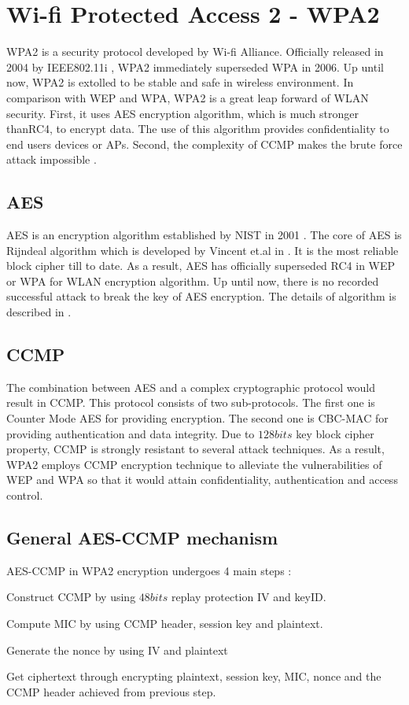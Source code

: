 \section{Wi-fi Protected Access 2 - WPA2}

\ac{WPA}2 is a security protocol developed by Wi-fi Alliance. Officially released in 2004 by \ac{IEEE}802.11i \cite{4248378}, \ac{WPA}2 immediately superseded \ac{WPA} in 2006. Up until now, \ac{WPA}2 is extolled to be stable and safe in wireless environment. In comparison with \ac{WEP} and \ac{WPA}, \ac{WPA}2 is a great leap forward of \ac{WLAN} security. First, it uses \ac{AES} encryption algorithm, which is much stronger than\ac{RC4}, to encrypt data. The use of this algorithm provides confidentiality to end users devices or \ac{AP}s. Second, the complexity of \ac{CCMP} makes the brute force attack impossible \cite{alblwi2017survey}.
\subsection{AES}
\ac{AES} is an encryption algorithm established by \ac{NIST} in 2001 \cite{standard2001announcing}. The core of \ac{AES} is Rijndeal algorithm which is developed by Vincent et.al in \cite{daemen1999aes}. It is the most reliable block cipher till to date. As a result, \ac{AES} has officially superseded \ac{RC4} in \ac{WEP} or \ac{WPA} for \ac{WLAN} encryption algorithm. Up until now, there is no recorded successful attack to break the key of \ac{AES} encryption. The details of algorithm is described in \cite{daemen1999aes}.
\subsection{CCMP}
The combination between \ac{AES} and a complex cryptographic protocol would result in \ac{CCMP}. This protocol consists of two sub-protocols. The first one is Counter Mode \ac{AES} for providing encryption. The second one is \ac{CBC-MAC} for providing authentication and data integrity. Due to $128bits$ key block cipher property, \ac{CCMP} is strongly resistant to several attack techniques. As a result, \ac{WPA}2 employs \ac{CCMP} encryption technique to alleviate the vulnerabilities of \ac{WEP} and \ac{WPA} so that it would attain confidentiality, authentication and access control.
\subsection{General AES-CCMP mechanism}
\ac{AES}-\ac{CCMP} in \ac{WPA}2 encryption undergoes 4 main steps \cite{kolokithas2015hacking}:
\begin{steps}
	\item Construct \ac{CCMP} by using $48bits$ replay protection \ac{IV} and keyID.
	\item Compute \ac{MIC} by using \ac{CCMP} header, session key and plaintext.
	\item Generate the nonce by using \ac{IV} and plaintext
	\item Get ciphertext through encrypting plaintext, session key, \ac{MIC}, nonce and the CCMP header achieved from previous step.
\end{steps}


